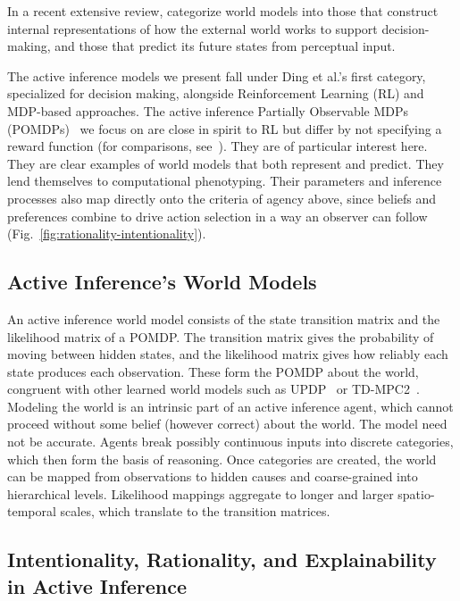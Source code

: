 \documentclass[letterpaper]{article} %
\theoremstyle{definition}
\begin{document}
In a recent extensive review, \citet{dingUnderstandingWorldPredicting2024} categorize world models into those that construct internal representations of how the external world works to support decision-making, and those that predict its future states from perceptual input.

The active inference models we present fall under Ding et al.'s first category, specialized for decision making, alongside Reinforcement Learning (RL) and MDP-based approaches. The active inference Partially Observable MDPs (POMDPs)~\citep{dacostaActiveInferenceDiscrete2020} we focus on are close in spirit to RL but differ by not specifying a reward function (for comparisons, see~\citep{tschantzREINFORCEMENTLEARNINGACTIVE2020,fristonReinforcementLearningActive2009a,dacostaRewardMaximizationDiscrete2023}). They are of particular interest here. They are clear examples of world models that both represent and predict. They lend themselves to computational phenotyping. Their parameters and inference processes also map directly onto the criteria of agency above, since beliefs and preferences combine to drive action selection in a way an observer can follow (Fig.~\ref{fig:rationality-intentionality}).

\subsection{Active Inference's World Models}

An active inference world model consists of the state transition matrix and the likelihood matrix of a POMDP. The transition matrix gives the probability of moving between hidden states, and the likelihood matrix gives how reliably each state produces each observation. These form the POMDP about the world, congruent with other learned world models such as UPDP~\citep{duLearningUniversalPolicies2023} or TD-MPC2~\citep{hansenTDMPC2ScalableRobust2024}. Modeling the world is an intrinsic part of an active inference agent, which cannot proceed without some belief (however correct) about the world. The model need not be accurate. Agents break possibly continuous inputs into discrete categories, which then form the basis of reasoning. Once categories are created, the world can be mapped from observations to hidden causes and coarse-grained into hierarchical levels. Likelihood mappings aggregate to longer and larger spatio-temporal scales, which translate to the transition matrices.

\subsection{Intentionality, Rationality, and Explainability in Active Inference}
\end{document}
